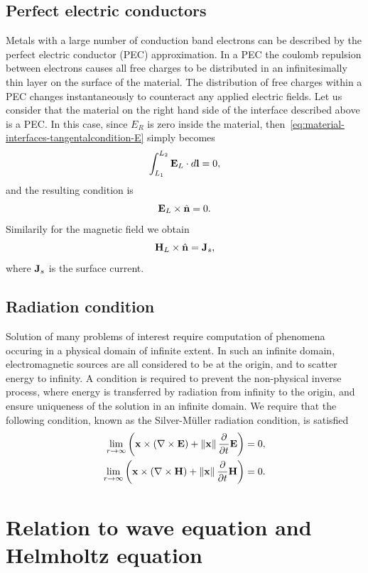\subsection{Perfect electric conductors}
Metals with a large number of conduction band electrons can be described by the
perfect electric conductor (PEC) approximation. In a PEC the coulomb repulsion
between electrons causes all free charges to be distributed in an
infinitesimally thin layer on the surface of the material. The distribution of
free charges within a PEC changes instantaneously to counteract any applied
electric fields. Let us consider that the material on the right hand side of the
interface described above is a PEC. In this case, since $E_R$ is zero inside the
material, then~\eqref{eq:material-interfaces-tangentalcondition-E} simply
becomes
$$
\int_{L_1}^{L_2} \mathbf{E}_L \cdot d\mathbf{l} = 0 ,
$$
and the resulting condition is
$$
\mathbf{E}_L \times \hat{\mathbf{n}} = 0 .
$$
Similarily for the magnetic field we obtain
$$
\mathbf{H}_L \times \hat{\mathbf{n}} = \mathbf{J}_s ,
$$
where $\mathbf{J}_s$ is the surface current.

\subsection{Radiation condition}
Solution of many problems of interest require computation of phenomena occuring
in a physical domain of infinite extent. In such an infinite domain, electromagnetic
sources are all considered to be at the origin, and to scatter energy to infinity.
A condition is required to prevent the non-physical inverse process, where energy
is transferred by radiation from infinity to the origin, and ensure uniqueness of
the solution in an infinite domain. We require that the following condition,
known as the Silver-M\"uller radiation condition, is satisfied
\begin{align}
  \lim_{ r \to \infty } \left( \mathbf{x} \times \left( \nabla \times \mathbf{E} \right) + \left\lVert\mathbf{x}\right\rVert \frac{\partial}{\partial t} \mathbf{E} \right) = 0, \\
  \lim_{ r \to \infty } \left( \mathbf{x} \times \left( \nabla \times \mathbf{H} \right) + \left\lVert\mathbf{x}\right\rVert \frac{\partial}{\partial t} \mathbf{H} \right) = 0.
\end{align}

\section{Relation to wave equation and Helmholtz equation}
